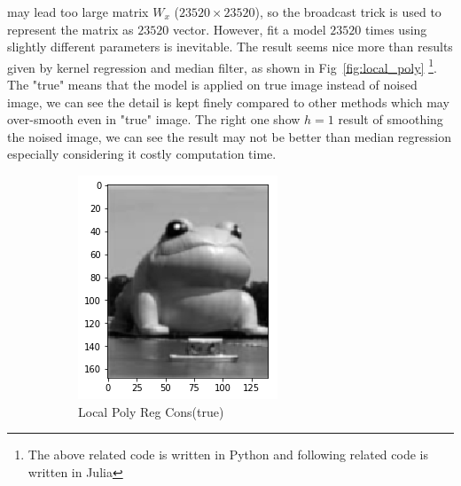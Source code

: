 \documentclass{article}
\begin{document}
may lead too large matrix $W_x$ ($23520 \times 23520$), so the broadcast trick is used to represent the matrix as 
$23520$ vector. However, fit a model $23520$ times using slightly different parameters is inevitable. 
The result seems nice more than results given by kernel regression and median filter, 
as shown in Fig~\ref{fig:local_poly} \footnote{The above related code is written in Python and following related code is written in Julia}.  
The "true" means that the model is applied on true image instead of noised image,
we can see the detail is kept finely compared to other methods which may over-smooth even in "true" image.
The right one show $h=1$ result of smoothing the noised image, we can see the result may not be better than median regression especially considering
it costly computation time. 

\begin{figure}[htb]
  \centering
  \begin{subfigure}[b]{0.24\linewidth}
    \includegraphics[width=\linewidth]{images/poly_nr.png}
    \caption{Local Poly Reg Cons(true)}
  \end{subfigure}
  \begin{subfigure}[b]{0.24\linewidth}

\end{subfigure}
\end{figure}
\end{document}
